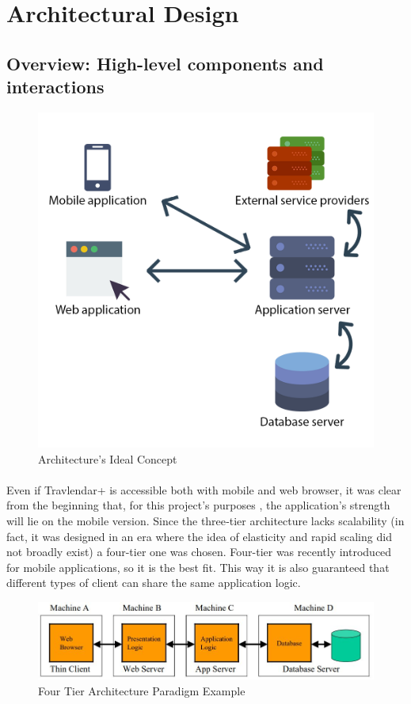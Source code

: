 \documentclass{article}
\begin{document}
	\section{Architectural Design}
		\subsection{Overview: High-level components and interactions}
			\begin{figure}[H]
			\includegraphics[width=\linewidth]{Images/Architecture/Architecture_design_2.png}
			\caption{Architecture's Ideal Concept}
			\label{fig:AC}
			\end{figure}
			\paragraph{}
Even if Travlendar+ is accessible both with mobile and web browser, it was clear from the beginning that, for this project’s purposes , the application’s strength will lie on the mobile version. Since   
the three‑tier architecture lacks scalability (in fact, it was designed in an era where the idea of elasticity and rapid scaling did not broadly exist) a four-tier one was chosen. Four-tier was recently introduced for mobile applications, so it is the best fit. This way it is also guaranteed that different types of client can share the same application logic. 
			\begin{figure}[H]
			\includegraphics[width=\linewidth]{Images/Architecture/4_Tier_Architecture.jpg}
			\caption{Four Tier Architecture Paradigm Example}
			\label{fig:4TA}
			\end{figure}
\end{document}
